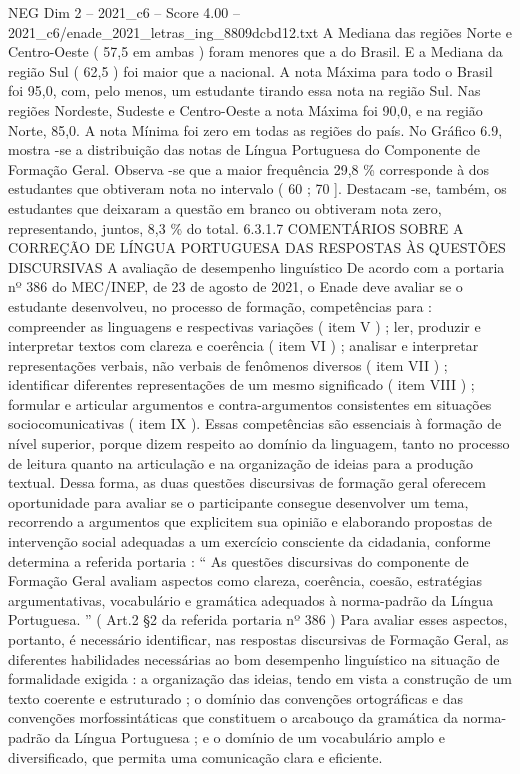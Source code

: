 \begin{textsample}{NEG Dim 2 – 2021\_c6 – Score 4.00 – 2021\_c6/enade\_2021\_letras\_ing\_8809dcbd12.txt}
A Mediana das regiões Norte e Centro-Oeste ( 57,5 em ambas ) foram menores que a do Brasil.
E a Mediana da região Sul ( 62,5 ) foi maior que a nacional.
A nota Máxima para todo o Brasil foi 95,0, com, pelo menos, um estudante tirando essa nota na região Sul.
Nas regiões Nordeste, Sudeste e Centro-Oeste a nota Máxima foi 90,0, e na região Norte, 85,0.
A nota Mínima foi zero em todas as regiões do país.
No Gráfico 6.9, mostra -se a distribuição das notas de Língua Portuguesa do Componente de Formação Geral.
Observa -se que a maior frequência 29,8 \% corresponde à dos estudantes que obtiveram nota no intervalo ( 60 ; 70 ].
Destacam -se, também, os estudantes que deixaram a questão em branco ou obtiveram nota zero, representando, juntos, 8,3 \% do total. 6.3.1.7 COMENTÁRIOS SOBRE A CORREÇÃO DE LÍNGUA PORTUGUESA DAS RESPOSTAS ÀS QUESTÕES DISCURSIVAS A avaliação de desempenho linguístico De acordo com a portaria nº 386 do MEC/INEP, de 23 de agosto de 2021, o Enade deve avaliar se o estudante desenvolveu, no processo de formação, competências para : compreender as linguagens e respectivas variações ( item V ) ; ler, produzir e interpretar textos com clareza e coerência ( item VI ) ; analisar e interpretar representações verbais, não verbais de fenômenos diversos ( item VII ) ; identificar diferentes representações de um mesmo significado ( item VIII ) ; formular e articular argumentos e contra-argumentos consistentes em situações sociocomunicativas ( item IX ).
Essas competências são essenciais à formação de nível superior, porque dizem respeito ao domínio da linguagem, tanto no processo de leitura quanto na articulação e na organização de ideias para a produção textual.
Dessa forma, as duas questões discursivas de formação geral oferecem oportunidade para avaliar se o participante consegue desenvolver um tema, recorrendo a argumentos que explicitem sua opinião e elaborando propostas de intervenção social adequadas a um exercício consciente da cidadania, conforme determina a referida portaria : “ As questões discursivas do componente de Formação Geral avaliam aspectos como clareza, coerência, coesão, estratégias argumentativas, vocabulário e gramática adequados à norma-padrão da Língua Portuguesa. ” ( Art.2 §2 da referida portaria nº 386 ) Para avaliar esses aspectos, portanto, é necessário identificar, nas respostas discursivas de Formação Geral, as diferentes habilidades necessárias ao bom desempenho linguístico na situação de formalidade exigida : a organização das ideias, tendo em vista a construção de um texto coerente e estruturado ; o domínio das convenções ortográficas e das convenções morfossintáticas que constituem o arcabouço da gramática da norma-padrão da Língua Portuguesa ; e o domínio de um vocabulário amplo e diversificado, que permita uma comunicação clara e eficiente.

\end{textsample}
